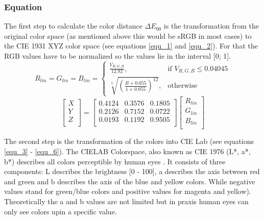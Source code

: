 \subsubsection{Equation}\label{subsec:equation}
The first step to calculate the color distance $\Delta E_{00}$ is the transformation from the original color space (as mentioned above this would be sRGB in most cases) to the CIE 1931 XYZ color space (see equations \ref{equ_1} and \ref{equ_2}). For that the RGB values have to be normalized so the values lie in the interval [0; 1]. 
\begin{equation}\label{equ_1}
R_{lin} = G_{lin} = B_{lin} =
	\begin{cases}
		\frac{V_{R,G,B}}{12.92}, & \text{if $V_{R,G,B} \leq 0.04045$}\\
		\sqrt[5]{(\frac{R + 0.055}{1 + 0.055})^{12}}, & \text{otherwise}
	\end{cases}
\end{equation}
\begin{equation}\label{equ_2}
\left[ \begin{array}{r}
X \\ 
Y \\
Z \\ 
\end{array}\right] = \left[ \begin{array}{rrr}
0.4124 & 0.3576 & 0.1805 \\ 
0.2126 & 0.7152 & 0.0722 \\
0.0193 & 0.1192 & 0.9505 \\ 
\end{array}\right] \left[ \begin{array}{r}
R_{lin} \\ 
G_{lin} \\
B_{lin} \\ 
\end{array}\right]
\end{equation}

The second step is the transformation of the colors into CIE Lab (see  equations \ref{equ_3} - \ref{equ_6}). The CIELAB Colorspace, also known as CIE 1976 (L*, a*, b*) describes all colors perceptible by human eyes \parencite{levkowitz1997}. It consists of three components: L describes the brightness [0 - 100], a describes the axis between red and green and b describes the axis of the blue and yellow colors. While negative values stand for green/blue colors and positive values for magenta and yellow). Theoretically the a and b values are not limited but in praxis human eyes can only see colors upin a specific value. 

